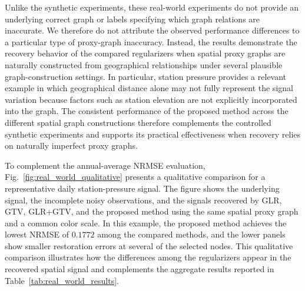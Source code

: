 Unlike the synthetic experiments, these real-world experiments do not provide an underlying correct graph or labels specifying which graph relations are inaccurate.
We therefore do not attribute the observed performance differences to a particular type of proxy-graph inaccuracy.
Instead, the results demonstrate the recovery behavior of the compared regularizers when spatial proxy graphs are naturally constructed from geographical relationships under several plausible graph-construction settings.
In particular, station pressure provides a relevant example in which geographical distance alone may not fully represent the signal variation because factors such as station elevation are not explicitly incorporated into the graph.
The consistent performance of the proposed method across the different spatial graph constructions therefore complements the controlled synthetic experiments and supports its practical effectiveness when recovery relies on naturally imperfect proxy graphs.

To complement the annual-average NRMSE evaluation, Fig.~\ref{fig:real_world_qualitative} presents a qualitative comparison for a representative daily station-pressure signal.
The figure shows the underlying signal, the incomplete noisy observations, and the signals recovered by GLR, GTV, GLR+GTV, and the proposed method using the same spatial proxy graph and a common color scale.
In this example, the proposed method achieves the lowest NRMSE of $0.1772$ among the compared methods, and the lower panels show smaller restoration errors at several of the selected nodes.
This qualitative comparison illustrates how the differences among the regularizers appear in the recovered spatial signal and complements the aggregate results reported in Table~\ref{tab:real_world_results}.